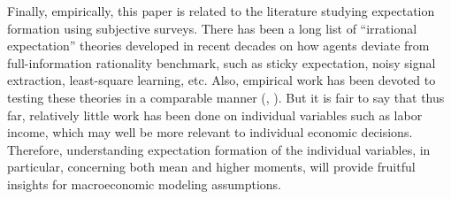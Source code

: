 Finally, empirically, this paper is related to the literature studying expectation formation using subjective surveys. There has been a long list of ``irrational expectation'' theories developed in recent decades on how agents deviate from full-information rationality benchmark, such as sticky expectation, noisy signal extraction, least-square learning, etc. Also, empirical work has been devoted to testing these theories in a comparable manner (\cite{coibion2012can},
\cite{fuhrer2018intrinsic}). But it is fair to say that thus far,
relatively little work has been done on individual variables such as labor income, which may well be more relevant to individual economic decisions. Therefore, understanding expectation formation of the individual variables, in particular, concerning both mean and higher moments, will provide fruitful insights for macroeconomic modeling assumptions.